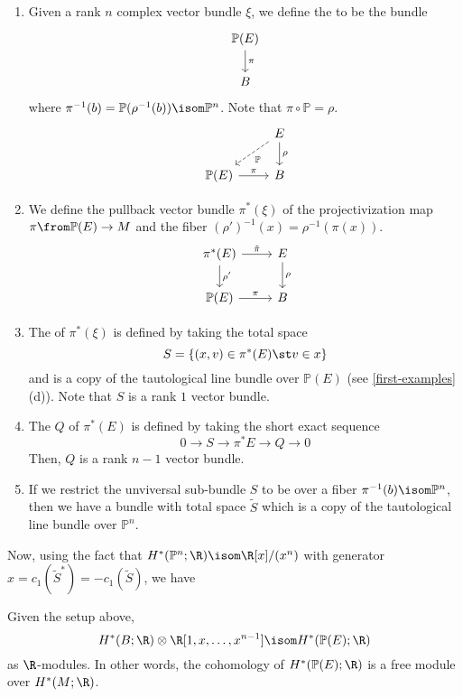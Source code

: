\documentclass[11pt,leqno,oneside]{amsbook}
\renewcommand{\P}{\mathbb{P}}
\numberwithin{thm}{section}
\begin{document}
\begin{defn}
  \begin{enumerate}
  \item Given a rank \(n\) complex vector bundle \(\xi\), we define
    the \de{projectivized bundle \(\P(\xi)\)} to be the
    bundle \[
      \begin{tikzcd}
        \P(E) \ar[d, "\pi"] \\
        B
      \end{tikzcd}
    \]
    where \(\pi^{-1}(b) = \P(\rho^{-1}(b)) \isom \P^n\). Note that
    \(\pi \circ \P = \rho\). \[
      \begin{tikzcd}
        & E \ar[d, "\rho"] \ar[ld, dashed, "\P"]\\
      \P(E) \ar[r, "\pi"] & B
      \end{tikzcd}
    \]
   \item We define the pullback vector bundle \(\pi^*(\xi)\) of the
     projectivization map 
    \(\pi \from \P(E) \to M\) and the
    fiber \((\rho')^{-1}(x) = \rho^{-1}(\pi(x))\). \[
      \begin{tikzcd}
        \pi^*(E) \ar[r,"\tilde{\pi}"] \ar[d, "\rho'"] & E
        \ar[d,"\rho"] \\ 
        \P(E) \ar[r, "\pi"] & B
      \end{tikzcd}
    \]
  \item The  of \(\pi^*(\xi)\) is defined by
    taking the total space \[
      S = \{(x,v) \in \pi^*(E) \st v \in x\}
    \]
    and is a copy of the tautological line bundle over \(\P(E)\) (see
    \ref{first-examples}(d)). Note that \(S\) is a rank \(1\) vector
    bundle. 
  \item The  \(Q\) of \(\pi^*(E)\) is
    defined by taking the short exact sequence \[
      0 \to S \to \pi^*E \to Q \to 0
    \]
    Then, \(Q\) is a rank \(n-1\) vector bundle.
  \item If we restrict the unviversal sub-bundle \(S\) to be over a
    fiber \(\pi^{-1}(b) \isom \P^n\), then we have a bundle with
    total space \(\tilde{S}\) which is a copy of the tautological
    line bundle over \(\P^n\).
  \end{enumerate}
\end{defn}
Now, using the fact that \(H^*(\P^n;\R) \isom \R[x]/(x^n)\) with
generator \(x = c_1(\tilde{S}^*) = -c_1(\tilde{S})\), we have
\begin{thm}
  Given the setup above, \[
     H^*(B;\R) \otimes \R[1,x,\ldots,x^{n-1}] \isom H^*(\P(E);\R)
  \]
  as \(\R\)-modules. In other words, the cohomology of
  \(H^*(\P(E);\R)\) is a free module over \(H^*(M;\R)\). 
\end{thm}
\begin{bibdiv}
  \begin{biblist}
  \end{biblist}
\end{bibdiv}
\end{document}

